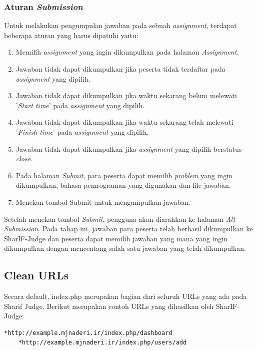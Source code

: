 \subsubsection{Aturan \textit{Submission}}
\label{sec: Aturan Submission}
Untuk melakukan pengumpulan jawaban pada sebuah \textit{assignment}, terdapat beberapa aturan yang harus dipatuhi yaitu:
\begin{enumerate}
    \item Memilih \textit{assignment} yang ingin dikumpulkan pada halaman \textit{Assignment}.
    \item Jawaban tidak dapat dikumpulkan jika peserta tidak terdaftar pada \textit{assignment} yang dipilih.
    \item Jawaban tidak dapat dikumpulkan jika waktu sekarang belum melewati ’\textit{Start time}’ pada \textit{assignment} yang dipilih.
    \item Jawaban tidak dapat dikumpulkan jika waktu sekarang telah melewati ’\textit{Finish time}’ pada \textit{assignment} yang dipilih.
    \item Jawaban tidak dapat dikumpulkan jika \textit{assignment} yang dipilih berstatus \textit{close}.
    \item Pada halaman \textit{Submit}, para peserta dapat memilih \textit{problem} yang ingin dikumpulkan, bahasa pemrograman yang digunakan dan file jawaban.
    \item Menekan tombol Submit untuk mengumpulkan jawaban.
\end{enumerate}
    Setelah menekan tombol \textit{Submit}, pengguna akan diarahkan ke halaman \textit{All Submission}. Pada tahap ini, jawaban para peserta telah berhasil dikumpulkan ke SharIF-Judge dan peserta dapat memilih jawaban yang mana yang ingin dikumpulkan dengan mencentang salah satu jawaban yang telah dikumpulkan.

\subsection{Clean URLs}
\label{sec: Clean URLs}
Secara default, index.php merupakan bagian dari seluruh URLs yang ada pada Sharif Judge. Berikut merupakan contoh URLs yang dihasilkan oleh SharIF-Judge:
 \begin{lstlisting}[basicstyle=\ttfamily, frame=single,
    columns=fullflexible, breaklines=true, numbers=none]
    *http://example.mjnaderi.ir/index.php/dashboard
    *http://example.mjnaderi.ir/index.php/users/add
    \end{lstlisting}
    
